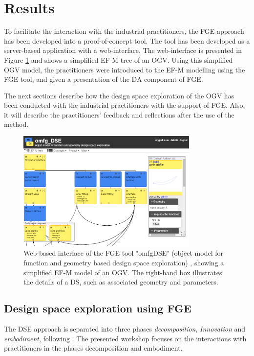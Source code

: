 \documentclass[preprints,article,accept,moreauthors,pdftex]{Definitions/mdpi}
\begin{document}
\section{Results}\label{sec:results}

To facilitate the interaction with the industrial practitioners, the \ac{FGE} approach has been developed into a proof-of-concept tool. The tool has been developed as a server-based application with a web-interface. 
The web-interface is presented in Figure \ref{fig:omfgDSEinterface} and shows a simplified EF-M tree of an \ac{OGV}. 
Using this simplified \ac{OGV} model, the practitioners were introduced to the \ac{EF-M} modelling using the \ac{FGE} tool, and given a presentation of the \ac{DA} component of \ac{FGE}.

The next sections describe how the design space exploration of the OGV has been conducted with the industrial practitioners with the support of FGE. 
Also, it will describe the practitioners' feedback and reflections after the use of the method.

\begin{figure}[ht]
    \centering
    \includegraphics[width=0.8\textwidth]{figures/omfgDSEinterface.png}
    \caption{Web-based interface of the FGE tool "omfgDSE" (object model for function and geometry based design space exploration) , showing a simplified EF-M model of an OGV.
    The right-hand box illustrates the details of a DS, such as associated geometry and parameters.}
    \label{fig:omfgDSEinterface}
\end{figure}

\subsection{Design space exploration using FGE}
The \ac{DSE} approach is separated into three phases \textit{decomposition}, \textit{Innovation} and \textit{embodiment}, following \cite{Muller2019Aiedam}.
The presented workshop focuses on the interactions with practitioners in the phases decomposition and embodiment.
\end{document}
